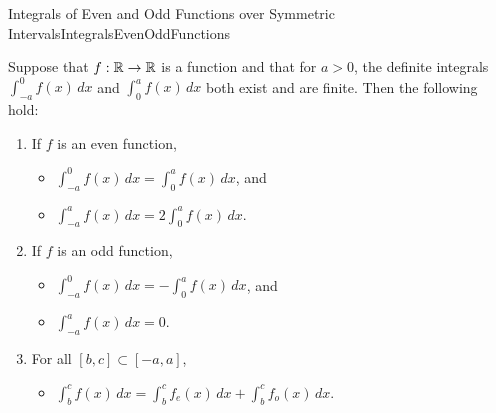 \begin{propColor}{Integrals of Even and Odd Functions over Symmetric Intervals}{IntegralsEvenOddFunctions}

Suppose that $f:\mathbb R \to \mathbb R $ is a function and that for $a>0$, the definite integrals  $\int_{-a}^0 f(x) \,dx $ and  $\int_{0}^a f(x)\, dx $ both exist and are finite. Then the following hold:
\begin{enumerate}
\renewcommand{\labelenumi}{(\alph{enumi})}
\setlength{\itemsep}{.2cm}
     \item If $f$ is an even function, 
     \begin{itemize}
         \item  $\int_{-a}^0 f(x)\, dx = \int_{0}^a f(x)\, dx $, and 
         \item  $\int_{-a}^a f(x)\, dx = 2\int_{0}^a f(x)\, dx $.
     \end{itemize}
     \item If $f$ is an odd function, 
     \begin{itemize}
         \item  $\int_{-a}^0 f(x)\, dx = -\int_{0}^a f(x)\, dx $, and 
         \item  $\int_{-a}^a f(x)\, dx = 0$.
     \end{itemize}
     \item For all $[b, c] \subset [-a, a]$,
      \begin{itemize}
         \item  $\int_{b}^c f(x)\, dx = \int_b^c f_e(x)\, dx + \int_b^c f_o(x)\, dx$.
     \end{itemize}
     
      \end{enumerate}

         
\end{propColor}

\bigskip

